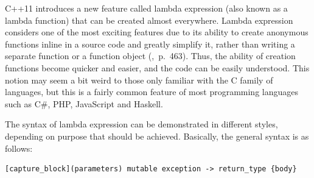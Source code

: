 \documentclass[11pt]{report}
\begin{document}
C++11 introduces a new feature called lambda expression (also known as a lambda function) that can be created almost everywhere. Lambda expression considers one of the most exciting features due to its ability to create anonymous functions inline in a source code and greatly simplify it, rather than writing a separate function or a function object (\cite{Gregorie:professionalcpp},~p.~463). Thus, the ability of creation functions become quicker and easier, and the code can be easily understood. This notion may seem a bit weird to those only familiar with the C family of languages, but this is a fairly common feature of most programming languages such as C\#, PHP, JavaScript and Haskell.

The syntax of lambda expression can be demonstrated in different styles, depending on purpose that should be achieved. Basically, the general syntax is as follows:
\begin{lstlisting}
[capture_block](parameters) mutable exception -> return_type {body}
\end{lstlisting}
\end{document}

